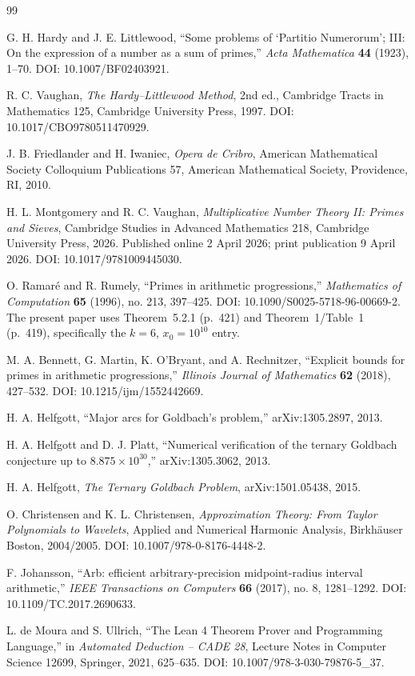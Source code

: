 \documentclass[11pt]{article}
\theoremstyle{definition}
\begin{document}
\begin{thebibliography}{99}

G. H. Hardy and J. E. Littlewood,
``Some problems of `Partitio Numerorum'; III: On the expression of a number as a sum of primes,''
\emph{Acta Mathematica} \textbf{44} (1923), 1--70.
DOI: 10.1007/BF02403921.

R. C. Vaughan,
\emph{The Hardy--Littlewood Method}, 2nd ed., Cambridge Tracts in Mathematics 125,
Cambridge University Press, 1997.
DOI: 10.1017/CBO9780511470929.

J. B. Friedlander and H. Iwaniec,
\emph{Opera de Cribro}, American Mathematical Society Colloquium Publications 57,
American Mathematical Society, Providence, RI, 2010.

H. L. Montgomery and R. C. Vaughan,
\emph{Multiplicative Number Theory II: Primes and Sieves},
Cambridge Studies in Advanced Mathematics 218, Cambridge University Press, 2026.
Published online 2 April 2026; print publication 9 April 2026.
DOI: 10.1017/9781009445030.

O. Ramar\'{e} and R. Rumely,
``Primes in arithmetic progressions,''
\emph{Mathematics of Computation} \textbf{65} (1996), no. 213, 397--425.
DOI: 10.1090/S0025-5718-96-00669-2. The present paper uses Theorem~5.2.1 (p.~421) and Theorem~1/Table~1 (p.~419), specifically the $k=6$, $x_0=10^{10}$ entry.

M. A. Bennett, G. Martin, K. O'Bryant, and A. Rechnitzer,
``Explicit bounds for primes in arithmetic progressions,''
\emph{Illinois Journal of Mathematics} \textbf{62} (2018), 427--532.
DOI: 10.1215/ijm/1552442669.

H. A. Helfgott,
``Major arcs for Goldbach's problem,''
arXiv:1305.2897, 2013.

H. A. Helfgott and D. J. Platt,
``Numerical verification of the ternary Goldbach conjecture up to $8.875\times10^{30}$,''
arXiv:1305.3062, 2013.

H. A. Helfgott,
\emph{The Ternary Goldbach Problem}, arXiv:1501.05438, 2015.

O. Christensen and K. L. Christensen,
\emph{Approximation Theory: From Taylor Polynomials to Wavelets},
Applied and Numerical Harmonic Analysis, Birkh\"auser Boston, 2004/2005.
DOI: 10.1007/978-0-8176-4448-2.

F. Johansson,
``Arb: efficient arbitrary-precision midpoint-radius interval arithmetic,''
\emph{IEEE Transactions on Computers} \textbf{66} (2017), no. 8, 1281--1292.
DOI: 10.1109/TC.2017.2690633.

L. de Moura and S. Ullrich,
``The Lean 4 Theorem Prover and Programming Language,''
in \emph{Automated Deduction -- CADE 28}, Lecture Notes in Computer Science 12699,
Springer, 2021, 625--635.
DOI: 10.1007/978-3-030-79876-5\_37.

\end{thebibliography}
\end{document}
